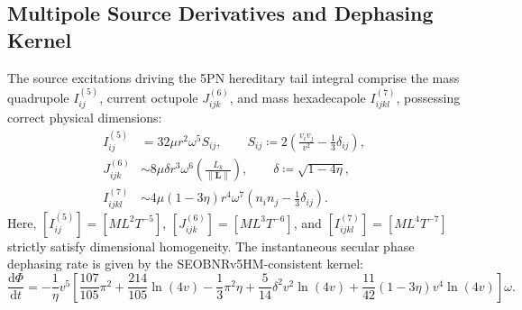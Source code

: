 \documentclass[11pt,a4paper,reqno]{article}
\theoremstyle{plain}
\theoremstyle{definition}
\theoremstyle{remark}
\numberwithin{equation}{section}
\numberwithin{table}{section}
\providecommand{\diff}{\mathrm{d}}
\begin{document}
\subsection{Multipole Source Derivatives and Dephasing Kernel}
The source excitations driving the 5PN hereditary tail integral comprise the mass quadrupole $I_{ij}^{(5)}$, current octupole $J_{ijk}^{(6)}$, and mass hexadecapole $I_{ijkl}^{(7)}$, possessing correct physical dimensions:
\begin{align}
  I_{ij}^{(5)} &= 32 \mu r^2 \omega^5 S_{ij}, \qquad S_{ij} \coloneqq 2 \left( \frac{v_i v_j}{v^2} - \frac{1}{3} \delta_{ij} \right), \\
  J_{ijk}^{(6)} &\sim 8 \mu \delta r^3 \omega^6 \left( \frac{L_k}{\|\bm{L}\|} \right), \qquad \delta \coloneqq \sqrt{1 - 4\eta}, \\
  I_{ijkl}^{(7)} &\sim 4 \mu (1 - 3\eta) r^4 \omega^7 \left( n_i n_j - \frac{1}{3} \delta_{ij} \right).
\end{align}
Here, $[I_{ij}^{(5)}] = [M L^2 T^{-5}]$, $[J_{ijk}^{(6)}] = [M L^3 T^{-6}]$, and $[I_{ijkl}^{(7)}] = [M L^4 T^{-7}]$ strictly satisfy dimensional homogeneity. The instantaneous secular phase dephasing rate is given by the SEOBNRv5HM-consistent kernel:
\begin{equation}
  \frac{\diff \Phi}{\diff t} = -\frac{1}{\eta} v^5 \left[ \frac{107}{105}\pi^2 + \frac{214}{105}\ln(4v) - \frac{1}{3}\pi^2\eta + \frac{5}{14}\delta^2 v^2 \ln(4v) + \frac{11}{42}(1-3\eta)v^4 \ln(4v) \right] \omega.
  \label{eq:dephasing_rate_kernel}
\end{equation}
\end{document}
